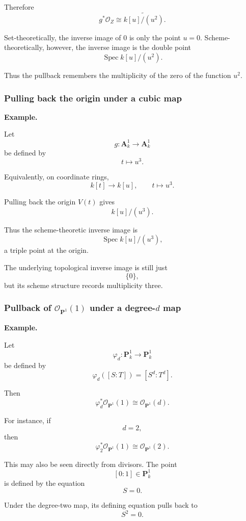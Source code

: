 Therefore
\[
\boxed{
	g^*\mathcal O_Z
	\cong
	\widetilde{k[u]/(u^2)}.
}
\]

Set-theoretically, the inverse image of \(0\) is only the point \(u=0\). Scheme-theoretically, however, the inverse image is the double point
\[
\operatorname{Spec}k[u]/(u^2).
\]

Thus the pullback remembers the multiplicity of the zero of the function \(u^2\).

\subsubsection{Pulling back the origin under a cubic map}

\textbf{Example.}

Let
\[
g:\mathbf A^1_k\longrightarrow\mathbf A^1_k
\]
be defined by
\[
t\longmapsto u^3.
\]

Equivalently, on coordinate rings,
\[
k[t]\longrightarrow k[u],
\qquad
t\longmapsto u^3.
\]

Pulling back the origin \(V(t)\) gives
\[
k[u]/(u^3).
\]

Thus the scheme-theoretic inverse image is
\[
\operatorname{Spec}k[u]/(u^3),
\]
a triple point at the origin.

The underlying topological inverse image is still just
\[
\{0\},
\]
but its scheme structure records multiplicity three.

\subsubsection{Pullback of \(\mathcal O_{\mathbf P^1}(1)\) under a degree-\(d\) map}

\textbf{Example.}

Let
\[
\varphi_d:\mathbf P^1_k\longrightarrow\mathbf P^1_k
\]
be defined by
\[
\varphi_d([S:T])=[S^d:T^d].
\]

Then
\[
\varphi_d^*\mathcal O_{\mathbf P^1}(1)
\cong
\mathcal O_{\mathbf P^1}(d).
\]

For instance, if
\[
d=2,
\]
then
\[
\varphi_2^*\mathcal O_{\mathbf P^1}(1)
\cong
\mathcal O_{\mathbf P^1}(2).
\]

This may also be seen directly from divisors. The point
\[
[0:1]\in\mathbf P^1_k
\]
is defined by the equation
\[
S=0.
\]

Under the degree-two map, its defining equation pulls back to
\[
S^2=0.
\]

